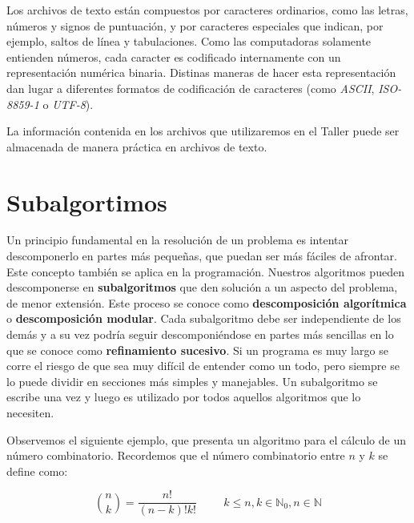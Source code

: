 \documentclass[
]{book}
\begin{document}
Los archivos de texto están compuestos por caracteres ordinarios, como las letras, números y signos de puntuación, y por caracteres especiales que indican, por ejemplo, saltos de línea y tabulaciones. Como las computadoras solamente entienden números, cada caracter es codificado internamente con un representación numérica binaria. Distinas maneras de hacer esta representación dan lugar a diferentes formatos de codificación de caracteres (como \emph{ASCII}, \emph{ISO-8859-1} o \emph{UTF-8}).

La información contenida en los archivos que utilizaremos en el Taller puede ser almacenada de manera práctica en archivos de texto.

\hypertarget{subalgortimos}{%
\chapter{Subalgortimos}\label{subalgortimos}}

Un principio fundamental en la resolución de un problema es intentar descomponerlo en partes más pequeñas, que puedan ser más fáciles de afrontar. Este concepto también se aplica en la programación. Nuestros algoritmos pueden descomponerse en \textbf{subalgoritmos} que den solución a un aspecto del problema, de menor extensión. Este proceso se conoce como \textbf{descomposición algorítmica} o \textbf{descomposición modular}. Cada subalgoritmo debe ser independiente de los demás y a su vez podría seguir descomponiéndose en partes más sencillas en lo que se conoce como \textbf{refinamiento sucesivo}. Si un programa es muy largo se corre el riesgo de que sea muy difícil de entender como un todo, pero siempre se lo puede dividir en secciones más simples y manejables. Un subalgoritmo se escribe una vez y luego es utilizado por todos aquellos algoritmos que lo necesiten.

Observemos el siguiente ejemplo, que presenta un algoritmo para el cálculo de un número combinatorio. Recordemos que el número combinatorio entre \(n\) y \(k\) se define como:

\[ {n \choose k} = \frac{n!}{(n-k)!k!} \hspace{1cm} k \le n, k \in \mathbb{N}_0, n \in \mathbb{N}\]
\end{document}
